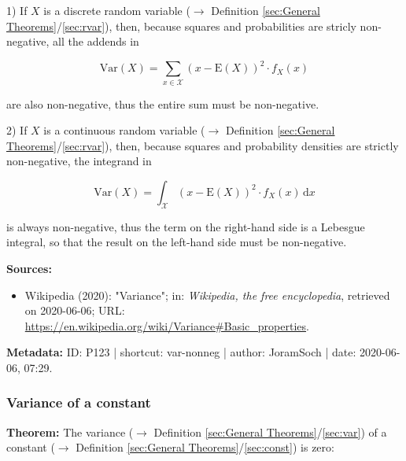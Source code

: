 \documentclass[a4paper,12pt,twoside]{book}
\begin{document}
\vspace{1em}
1) If $X$ is a discrete random variable ($\rightarrow$ Definition \ref{sec:General Theorems}/\ref{sec:rvar}), then, because squares and probabilities are stricly non-negative, all the addends in

\begin{equation} \label{eq:var-nonneg-var-disc}
\mathrm{Var}(X) = \sum_{x \in \mathcal{X}} (x-\mathrm{E}(X))^2 \cdot f_X(x)
\end{equation}

are also non-negative, thus the entire sum must be non-negative.

\vspace{1em}
2) If $X$ is a continuous random variable ($\rightarrow$ Definition \ref{sec:General Theorems}/\ref{sec:rvar}), then, because squares and probability densities are strictly non-negative, the integrand in

\begin{equation} \label{eq:var-nonneg-var-cont}
\mathrm{Var}(X) = \int_{\mathcal{X}} (x-\mathrm{E}(X))^2 \cdot f_X(x) \, \mathrm{d}x
\end{equation}

is always non-negative, thus the term on the right-hand side is a Lebesgue integral, so that the result on the left-hand side must be non-negative.


\vspace{1em}
\textbf{Sources:}
\begin{itemize}
\item Wikipedia (2020): "Variance"; in: \textit{Wikipedia, the free encyclopedia}, retrieved on 2020-06-06; URL: \url{https://en.wikipedia.org/wiki/Variance#Basic_properties}.
\end{itemize}


\vspace{1em}
\textbf{Metadata:} ID: P123 | shortcut: var-nonneg | author: JoramSoch | date: 2020-06-06, 07:29.
\vspace{1em}



\subsubsection[\textbf{Variance of a constant}]{Variance of a constant} \label{sec:var-const}
\setcounter{equation}{0}

\textbf{Theorem:} The variance ($\rightarrow$ Definition \ref{sec:General Theorems}/\ref{sec:var}) of a constant ($\rightarrow$ Definition \ref{sec:General Theorems}/\ref{sec:const}) is zero:
\end{document}
